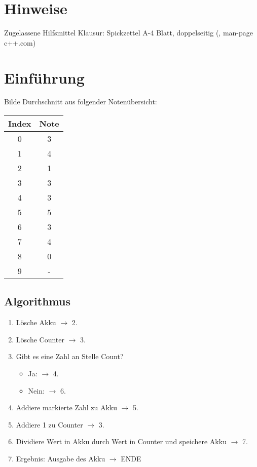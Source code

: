 






\maketitle
\newpage
\tableofcontents
\newpage

\section*{Hinweise}

Zugelassene Hilfsmittel Klausur: Spickzettel A-4 Blatt, doppelseitig (, man-page c++.com)

\section{Einführung}

Bilde Durchschnitt aus folgender Notenübersicht:

\begin{tabular}{c c}
Index & Note\\
\hline
0&3\\
1&4\\
2&1\\
3&3\\
4&3\\
5&5\\
6&3\\
7&4\\
8&0\\
9&-\\
\end{tabular}

\subsection{Algorithmus}
\begin{enumerate}
\item Lösche Akku $\rightarrow$  2.
\item Lösche Counter $\rightarrow$  3.
\item Gibt es eine Zahl an Stelle Count? 
\begin{itemize}
\item Ja: $\rightarrow$  4.
\item Nein: $\rightarrow$  6.
\end{itemize}
\item Addiere markierte Zahl zu Akku $\rightarrow$  5.
\item Addiere 1 zu Counter $\rightarrow$  3.
\item Dividiere Wert in Akku durch Wert in Counter und speichere Akku $\rightarrow $ 7.
\item Ergebnis: Ausgabe des Akku $\rightarrow$ ENDE
\end{enumerate}

